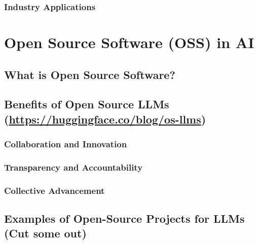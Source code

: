\documentclass[
]{book}
\begin{document}
\hypertarget{industry-applications}{%
\subsection{Industry Applications}\label{industry-applications}}

\hypertarget{open-source-software-oss-in-ai}{%
\chapter{Open Source Software (OSS) in AI}\label{open-source-software-oss-in-ai}}

\hypertarget{what-is-open-source-software}{%
\section{What is Open Source Software?}\label{what-is-open-source-software}}

\hypertarget{benefits-of-open-source-llms-httpshuggingface.coblogos-llms}{%
\section{\texorpdfstring{Benefits of Open Source LLMs (\url{https://huggingface.co/blog/os-llms})}{Benefits of Open Source LLMs (https://huggingface.co/blog/os-llms)}}\label{benefits-of-open-source-llms-httpshuggingface.coblogos-llms}}

\hypertarget{collaboration-and-innovation}{%
\subsection{Collaboration and Innovation}\label{collaboration-and-innovation}}

\hypertarget{transparency-and-accountability}{%
\subsection{Transparency and Accountability}\label{transparency-and-accountability}}

\hypertarget{collective-advancement}{%
\subsection{Collective Advancement}\label{collective-advancement}}

\hypertarget{examples-of-open-source-projects-for-llms-cut-some-out}{%
\section{Examples of Open-Source Projects for LLMs (Cut some out)}\label{examples-of-open-source-projects-for-llms-cut-some-out}}
\end{document}

